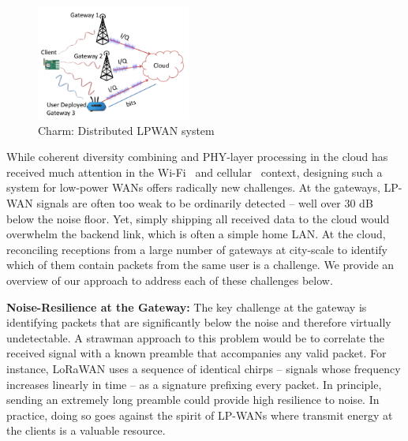 \begin{figure}
    \centering
    \includegraphics[width=0.45\textwidth]{location-aware-network/figures/LoRaRAN.pdf}
    \caption{Charm: Distributed LPWAN system}
    \label{fig:my_label}
\end{figure}




While coherent diversity combining and PHY-layer processing in the cloud has received much attention in the Wi-Fi~\cite{tan2009sam, xie2014scalable} and cellular~\cite{checko2015cloud, wubben2014benefits} context, designing such a system for low-power WANs offers radically new challenges. At the gateways,  LP-WAN signals are often too weak to be ordinarily detected -- well over 30 dB below the noise floor. Yet, simply shipping all received data to the cloud would overwhelm the backend link, which is often  a simple home LAN. At the cloud, reconciling receptions from a large number of gateways at city-scale to identify which of them contain packets from the same user is a challenge. We provide an overview of our approach to address each of these challenges below. 


\textbf{Noise-Resilience at the Gateway:} The key challenge at the gateway is identifying packets that are significantly below the noise and therefore virtually undetectable. A strawman approach to this problem would be to correlate the received signal with a known preamble that accompanies any valid packet. For instance, LoRaWAN uses a sequence of identical chirps -- signals whose frequency increases linearly in time -- as a signature prefixing every packet. In principle, sending an extremely long preamble could provide high resilience to noise. In practice, doing so goes against the spirit of LP-WANs where transmit energy at the clients is a valuable resource. 

